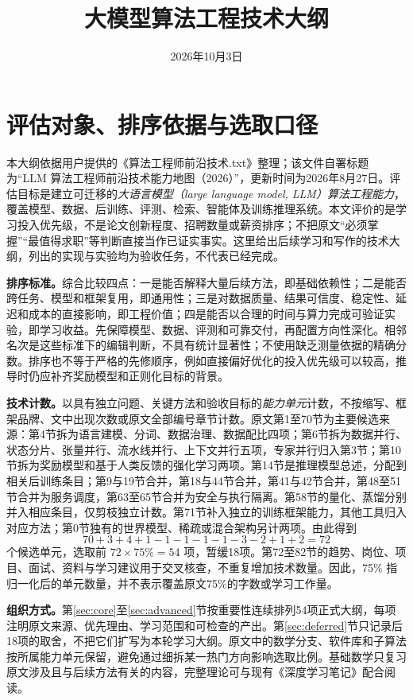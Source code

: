 \documentclass[UTF8,12pt,a4paper,fontset=fandol]{ctexart}
\title{大模型算法工程技术大纲}
\author{}
\date{2026年10月3日}
\begin{document}
\maketitle

\section{评估对象、排序依据与选取口径}
\label{sec:scope}

本大纲依据用户提供的《算法工程师前沿技术.txt》整理；该文件自署标题为“LLM 算法工程师前沿技术能力地图（2026）”，更新时间为2026年8月27日。评估目标是建立可迁移的\emph{大语言模型（large language model, LLM）算法工程能力}，覆盖模型、数据、后训练、评测、检索、智能体及训练推理系统。本文评价的是学习投入优先级，不是论文创新程度、招聘数量或薪资排序；不把原文“必须掌握”“最值得求职”等判断直接当作已证实事实。这里给出后续学习和写作的技术大纲，列出的实现与实验均为验收任务，不代表已经完成。

\textbf{排序标准。}综合比较四点：一是能否解释大量后续方法，即基础依赖性；二是能否跨任务、模型和框架复用，即通用性；三是对数据质量、结果可信度、稳定性、延迟和成本的直接影响，即工程价值；四是能否以合理的时间与算力完成可验证实验，即学习收益。先保障模型、数据、评测和可靠交付，再配置方向性深化。相邻名次是这些标准下的编辑判断，不具有统计显著性；不使用缺乏测量依据的精确分数。排序也不等于严格的先修顺序，例如直接偏好优化的投入优先级可以较高，推导时仍应补齐奖励模型和正则化目标的背景。

\textbf{技术计数。}以具有独立问题、关键方法和验收目标的\emph{能力单元}计数，不按缩写、框架品牌、文中出现次数或原文全部编号章节计数。原文第1至70节为主要候选来源：第4节拆为语言建模、分词、数据治理、数据配比四项；第6节拆为数据并行、状态分片、张量并行、流水线并行、上下文并行五项，专家并行归入第3节；第10节拆为奖励模型和基于人类反馈的强化学习两项。第14节是推理模型总述，分配到相关后训练条目；第9与19节合并，第18与44节合并，第41与42节合并，第48至51节合并为服务调度，第63至65节合并为安全与执行隔离。第58节的量化、蒸馏分别并入相应条目，仅剪枝独立计数。第71节补入独立的训练框架能力，其他工具归入对应方法；第0节独有的世界模型、稀疏或混合架构另计两项。由此得到
\[
70+3+4+1-1-1-1-1-3-2+1+2=72
\]
个候选单元，选取前 $72\times75\%=54$ 项，暂缓18项。第72至82节的趋势、岗位、项目、面试、资料与学习建议用于交叉核查，不重复增加技术数量。因此，75\% 指归一化后的单元数量，并不表示覆盖原文75\%的字数或学习工作量。

\textbf{组织方式。}第\ref{sec:core}至\ref{sec:advanced}节按重要性连续排列54项正式大纲，每项注明原文来源、优先理由、学习范围和可检查的产出。第\ref{sec:deferred}节只记录后18项的取舍，不把它们扩写为本轮学习大纲。原文中的数学分支、软件库和子算法按所属能力单元保留，避免通过细拆某一热门方向影响选取比例。基础数学只复习原文涉及且与后续方法有关的内容，完整理论可与现有《深度学习笔记》配合阅读。
\end{document}
